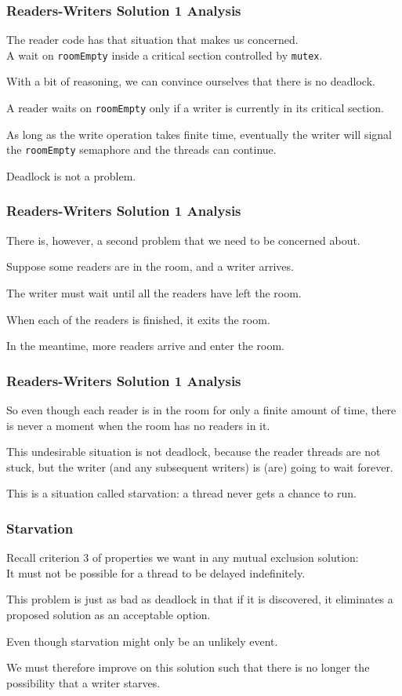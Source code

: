 \begin{frame}
\frametitle{Readers-Writers Solution 1 Analysis}

The reader code has that situation that makes us concerned.\\
\quad A wait on \texttt{roomEmpty} inside a critical section controlled by \texttt{mutex}. 

With a bit of reasoning, we can convince ourselves that there is no deadlock.

A reader waits on \texttt{roomEmpty} only if a writer is currently in its critical section.

As long as the write operation takes finite time, eventually the writer will signal the \texttt{roomEmpty} semaphore and the threads can continue. 

Deadlock is not a problem.

\end{frame}


\begin{frame}
\frametitle{Readers-Writers Solution 1 Analysis}

There is, however, a second problem that we need to be concerned about. 

Suppose some readers are in the room, and a writer arrives. 

The writer must wait until all the readers have left the room. 

When each of the readers is finished, it exits the room. 

In the meantime, more readers arrive and enter the room.
\end{frame}


\begin{frame}
\frametitle{Readers-Writers Solution 1 Analysis}

So even though each reader is in the room for only a finite amount of time, there is never a moment when the room has no readers in it. 

This undesirable situation is not deadlock, because the reader threads are not stuck, but the writer (and any subsequent writers) is (are) going to wait forever.

This is a situation called \alert{starvation}: a thread never gets a chance to run.


\end{frame}


\begin{frame}
\frametitle{Starvation}

Recall criterion 3 of properties we want in any mutual exclusion solution:\\
\quad It must not be possible for a thread to be delayed indefinitely. 

This problem is just as bad as deadlock in that if it is discovered, it eliminates a proposed solution as an acceptable option.

Even though starvation might only be an unlikely event. 

We must therefore improve on this solution such that there is no longer the possibility that a writer starves.


\end{frame}


